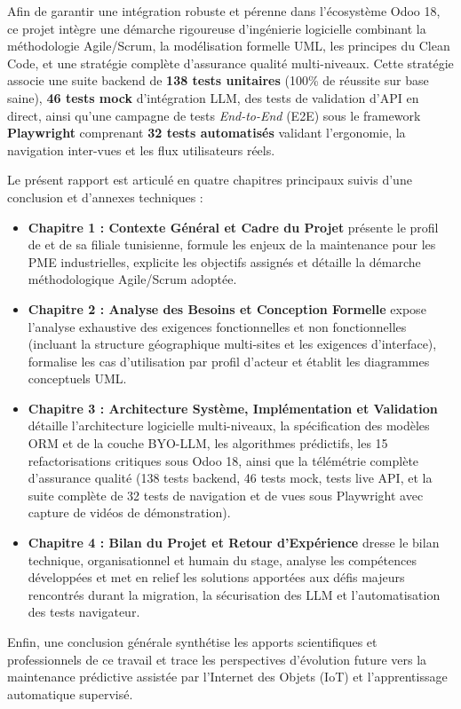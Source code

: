 Afin de garantir une intégration robuste et pérenne dans l'écosystème Odoo 18, ce projet intègre une démarche rigoureuse d'ingénierie logicielle combinant la méthodologie Agile/Scrum, la modélisation formelle UML, les principes du Clean Code, et une stratégie complète d'assurance qualité multi-niveaux. Cette stratégie associe une suite backend de \textbf{138 tests unitaires} (100\% de réussite sur base saine), \textbf{46 tests mock} d'intégration LLM, des tests de validation d'API en direct, ainsi qu'une campagne de tests \textit{End-to-End} (E2E) sous le framework \textbf{Playwright} comprenant \textbf{32 tests automatisés} validant l'ergonomie, la navigation inter-vues et les flux utilisateurs réels.

Le présent rapport est articulé en quatre chapitres principaux suivis d'une conclusion et d'annexes techniques :

\begin{itemize}[leftmargin=1.5cm, label=\textcolor{odooPurple}{\small\textbullet}]
    \item \textbf{Chapitre 1 : Contexte Général et Cadre du Projet} présente le profil de \textbf{\companyName} et de sa filiale tunisienne, formule les enjeux de la maintenance pour les PME industrielles, explicite les objectifs assignés et détaille la démarche méthodologique Agile/Scrum adoptée.
    \item \textbf{Chapitre 2 : Analyse des Besoins et Conception Formelle} expose l'analyse exhaustive des exigences fonctionnelles et non fonctionnelles (incluant la structure géographique multi-sites et les exigences d'interface), formalise les cas d'utilisation par profil d'acteur et établit les diagrammes conceptuels UML.
    \item \textbf{Chapitre 3 : Architecture Système, Implémentation et Validation} détaille l'architecture logicielle multi-niveaux, la spécification des modèles ORM et de la couche BYO-LLM, les algorithmes prédictifs, les 15 refactorisations critiques sous Odoo 18, ainsi que la télémétrie complète d'assurance qualité (138 tests backend, 46 tests mock, tests live API, et la suite complète de 32 tests de navigation et de vues sous Playwright avec capture de vidéos de démonstration).
    \item \textbf{Chapitre 4 : Bilan du Projet et Retour d'Expérience} dresse le bilan technique, organisationnel et humain du stage, analyse les compétences développées et met en relief les solutions apportées aux défis majeurs rencontrés durant la migration, la sécurisation des LLM et l'automatisation des tests navigateur.
\end{itemize}

Enfin, une conclusion générale synthétise les apports scientifiques et professionnels de ce travail et trace les perspectives d'évolution future vers la maintenance prédictive assistée par l'Internet des Objets (IoT) et l'apprentissage automatique supervisé.
